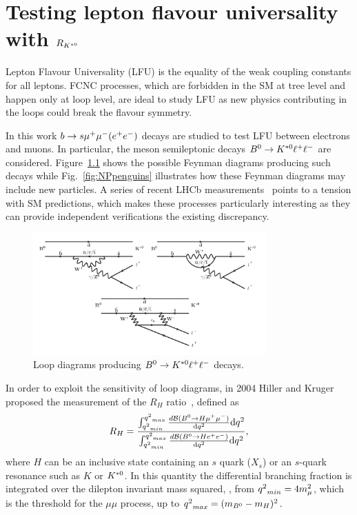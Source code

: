 \chapter{Testing lepton flavour universality with $R_{{{K}^{*0}}}$}
\label{sec:RKst_theory}

Lepton Flavour Universality (LFU) is the equality of the weak coupling constants for all leptons.
FCNC processes, which are forbidden in the SM at tree level and happen only at loop level,
are ideal to study LFU as new physics contributing in the loops could break the flavour symmetry.
 
In this work $b \rightarrow s{\mu^+\mu^-} (e^+ e^-)$ decays are studied to test LFU between electrons and muons. 
In particular, the \Bz meson semileptonic decays ${{B}^0}\rightarrow{\ensuremath{{K}^{*0}}}\ell^+ \ell^-$ are considered.
Figure~\ref{fig:RKpenguins} shows the possible Feynman diagrams  producing such decays while 
Fig.~\ref{fig:NPpenguins} illustrates how these Feynman diagrams may include new particles. 
A series of recent LHCb measurements~\cite{TomRDreview} points to a tension with SM predictions, which makes
these processes particularly interesting as they can provide independent verifications the existing discrepancy.
%
\begin{figure}[h]
\centering \includegraphics[width=0.8\textwidth]{RKst/figs/penguins3.png}
\caption{Loop diagrams producing ${{B}^0} \rightarrow {\ensuremath{{K}^{*0}}}\ell^+ \ell^-$ decays.}
\label{fig:RKpenguins}
\end{figure}

In order to exploit the sensitivity of loop diagrams, in 2004 Hiller and Kruger proposed the measurement 
of the $R_H$ ratio~\cite{Hiller:2003js}, defined as
\begin{equation}
\label{eqRX}
R_{H} = \frac{\int_{{q^2}_{min}}^{{q^2}_{max}} \frac{ d{\cal B}({{B}^0} \rightarrow H {\mu^+\mu^-}) }{\mathrm{d}{q^2}}\mathrm{d}{q^2}}{ \int_{{q^2}_{min}}^{{q^2}_{max}}\frac{ d{\cal B}({{B}^0} \rightarrow H{e^+e^-}) }{\mathrm{d}{q^2}} \mathrm{d}{q^2}} ,
\end{equation}
where $H$ can be an inclusive state containing an $s$ quark ($X_s$) or an $s$-quark resonance such as $K$ or ${{K}^{*0}}$.
In this quantity the differential branching fraction is integrated over the dilepton invariant mass squared, \qsq, from 
${q^2}_{min} = 4m_{\mu}^2$, which is the threshold for the $\mu\mu$ process, up to \mbox{${q^2}_{max} = (m_{{{B}^0}} - m_H)^2$.} 

